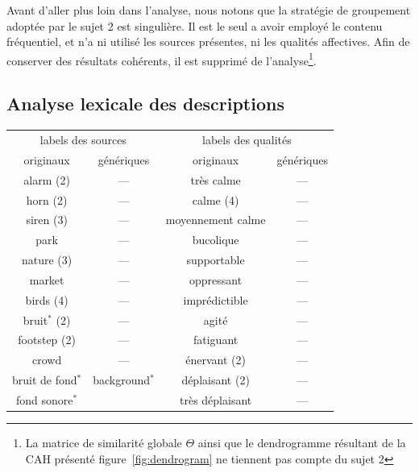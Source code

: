 Avant d'aller plus loin dans l'analyse, nous notons que la stratégie de groupement adoptée par le sujet 2 est singulière. Il est le seul a avoir employé le contenu fréquentiel, et n'a ni utilisé les sources présentes, ni les qualités affectives. Afin de conserver des résultats cohérents, il est supprimé de l'analyse\footnote{La matrice de similarité globale $\Theta$ ainsi que le dendrogramme résultant de la CAH présenté figure~\ref{fig:dendrogram} ne tiennent pas compte du sujet 2}. 

\subsection{Analyse lexicale des descriptions}
\label{sec:ch5_xp3AnalyseLexicale}

\begin{table}[t]
\centering
\tiny
\begin{tabular}{cc|cc}
\multicolumn{2}{c|}{labels des sources}         & \multicolumn{2}{c}{labels des qualités}      \\
originaux             & génériques              & originaux & génériques       \\
\hline
alarm (2)             & ---                     &  très calme            & --- \\
horn  (2)             & ---                     &  calme (4)             & ---   \\ 
siren (3)             & ---                     &  moyennement calme     & ---  \\ 
park                  & ---                     &  bucolique             & ---   \\
nature (3)            & ---                     &  supportable           & ---  \\
market                & ---                     &  oppressant            & ---\\
birds (4)             & ---                     &  imprédictible         & ---  \\ 
bruit$^*$ (2)         & ---                     &  agité                 & --- \\ 
footstep (2)          & ---                     &  fatiguant             & --- \\
crowd                 & ---                     &  énervant (2)          & --- \\
\cline{1-2}         
bruit de fond$^*$     & background$^*$          &  déplaisant (2)        & ---   \\ 
fond sonore$^*$       &                         &  très déplaisant       & ---    \\ 

\end{tabular}
\end{table}
